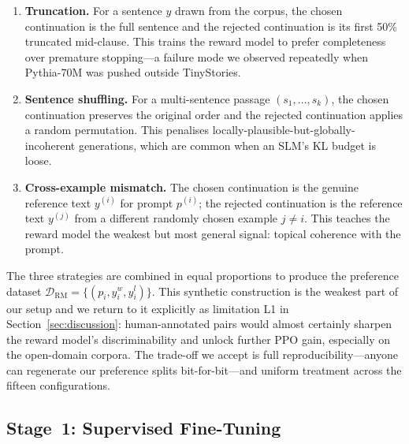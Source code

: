 \documentclass[10pt,twocolumn,letterpaper]{article}
\begin{document}
\begin{enumerate}[topsep=2pt, itemsep=2pt, leftmargin=*]
  \item \textbf{Truncation.} For a sentence $y$ drawn from the corpus, the chosen continuation is the full sentence and the rejected continuation is its first 50\% truncated mid-clause. This trains the reward model to prefer completeness over premature stopping---a failure mode we observed repeatedly when Pythia-70M was pushed outside TinyStories.
  \item \textbf{Sentence shuffling.} For a multi-sentence passage $(s_1,\ldots,s_k)$, the chosen continuation preserves the original order and the rejected continuation applies a random permutation. This penalises locally-plausible-but-globally-incoherent generations, which are common when an SLM's KL budget is loose.
  \item \textbf{Cross-example mismatch.} The chosen continuation is the genuine reference text $y^{(i)}$ for prompt $p^{(i)}$; the rejected continuation is the reference text $y^{(j)}$ from a different randomly chosen example $j\ne i$. This teaches the reward model the weakest but most general signal: topical coherence with the prompt.
\end{enumerate}

The three strategies are combined in equal proportions to produce the preference dataset $\mathcal{D}_{\text{RM}}=\{(p_i, y_i^{w}, y_i^{l})\}$. This synthetic construction is the weakest part of our setup and we return to it explicitly as limitation L1 in Section~\ref{sec:discussion}: human-annotated pairs would almost certainly sharpen the reward model's discriminability and unlock further PPO gain, especially on the open-domain corpora. The trade-off we accept is full reproducibility---anyone can regenerate our preference splits bit-for-bit---and uniform treatment across the fifteen configurations.

\subsection{Stage~1: Supervised Fine-Tuning}
\label{sec:sft}
\end{document}
